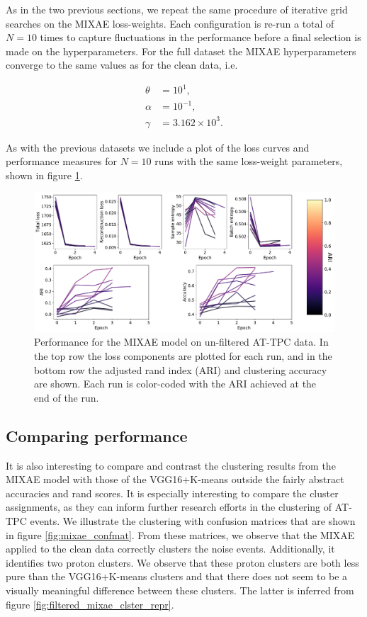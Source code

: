 \documentclass[preprint,12pt]{elsarticle}
\begin{document}
As in the two previous sections, we repeat the same procedure of iterative grid searches on the MIXAE loss-weights. Each configuration is re-run a total of $N=10$ times to capture fluctuations in the performance before a final selection is made on the hyperparameters. For the full dataset the MIXAE hyperparameters converge to the same values as for the clean data, i.e. 


\begin{align}
\theta &= 10^{1}, \\
\alpha &= 10^{-1}, \\
\gamma &= 3.162\times 10^3.
\end{align}

\noindent As with the previous datasets we include a plot of the loss curves and performance measures for $N=10$ runs with the same loss-weight parameters, shown in figure \ref{fig:mixae_full}.

\begin{figure}[H]
\centering
\includegraphics[width=\textwidth]{./plots/real_mixae.pdf}
\caption[Clustering performance of MIXAE on full event AT-TPC data]{Performance for the MIXAE model on un-filtered AT-TPC data. In the top row the loss components are plotted for each run, and in the bottom row the adjusted rand index (ARI) and clustering accuracy are shown. Each run is color-coded with the ARI achieved at the end of the run.}\label{fig:mixae_full}
\end{figure}

\subsection{Comparing performance}

It is also interesting to compare and contrast the clustering results from the MIXAE model with those of the VGG16$+$K-means outside the fairly abstract accuracies and rand scores. It is especially interesting to compare the cluster assignments, as they can inform further research efforts in the clustering of AT-TPC events. We illustrate the clustering with confusion matrices that are shown in figure \ref{fig:mixae_confmat}. From these matrices, we observe that the MIXAE applied to the clean data correctly clusters the noise events. Additionally, it identifies two proton clusters. We observe that these proton clusters are both less pure than the VGG16+K-means clusters and that there does not seem to be a visually meaningful difference between these clusters. The latter is inferred from figure \ref{fig:filtered_mixae_clster_repr}. 
\end{document}
